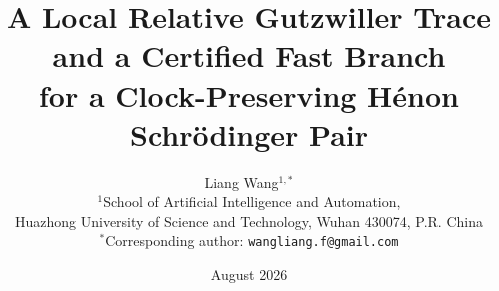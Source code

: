 \documentclass[11pt]{article}
\title{A Local Relative Gutzwiller Trace and a Certified Fast Branch\\
for a Clock-Preserving H\'enon Schr\"odinger Pair}
\author{Liang Wang$^{1,*}$\\[2mm]
\small $^1$School of Artificial Intelligence and Automation,\\[-1mm]
\small Huazhong University of Science and Technology, Wuhan 430074, P.R. China\\[-1mm]
\small $^*$Corresponding author: \texttt{wangliang.f@gmail.com}}
\date{August 2026}
\begin{document}
\maketitle



\tableofcontents











\clearpage
\appendix








\begingroup
\sloppy


\endgroup
\end{document}
